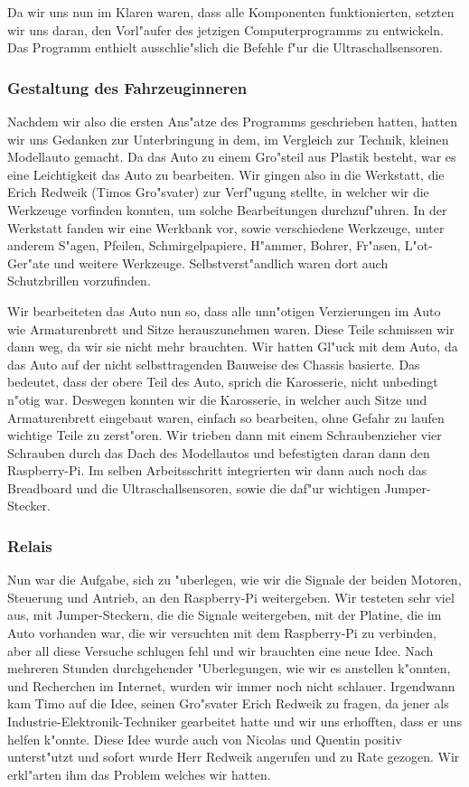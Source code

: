 \documentclass[a4paper,12pt]{article}
\begin{document}
Da wir uns nun im Klaren waren, dass alle Komponenten funktionierten, setzten wir uns daran, den Vorl"aufer des jetzigen Computerprogramms zu entwickeln.
Das Programm enthielt ausschlie"slich die Befehle f"ur die Ultraschallsensoren.

\subsubsection{Gestaltung des Fahrzeuginneren}\label{sec2.1.3}

Nachdem wir also die ersten Ans"atze des Programms geschrieben hatten, hatten wir uns Gedanken zur Unterbringung in dem, im Vergleich zur Technik, kleinen Modellauto gemacht.
Da das Auto zu einem Gro"steil aus Plastik besteht, war es eine Leichtigkeit das Auto zu bearbeiten.
Wir gingen also in die Werkstatt, die Erich Redweik (Timos Gro"svater) zur Verf"ugung stellte, in welcher wir die Werkzeuge vorfinden konnten, um solche Bearbeitungen durchzuf"uhren.
In der Werkstatt fanden wir eine Werkbank vor, sowie verschiedene Werkzeuge, unter anderem S"agen, Pfeilen, Schmirgelpapiere, H"ammer, Bohrer, Fr"asen, L"ot-Ger"ate und weitere Werkzeuge. Selbstverst"andlich waren dort auch Schutzbrillen vorzufinden.

Wir bearbeiteten das Auto nun so, dass alle unn"otigen Verzierungen im Auto wie Armaturenbrett und Sitze herauszunehmen waren.
Diese Teile schmissen wir dann weg, da wir sie nicht mehr brauchten.
Wir hatten Gl"uck mit dem Auto, da das Auto auf der nicht selbsttragenden Bauweise des Chassis basierte.
Das bedeutet, dass der obere Teil des Auto, sprich die Karosserie, nicht unbedingt n"otig war.
Deswegen konnten wir die Karosserie, in welcher auch Sitze und  Armaturenbrett eingebaut waren, einfach so bearbeiten, ohne Gefahr zu laufen wichtige Teile zu zerst"oren.
Wir trieben dann mit einem Schraubenzieher vier Schrauben durch das Dach des Modellautos und befestigten daran dann den Raspberry-Pi.
Im selben Arbeitsschritt integrierten wir dann auch noch das Breadboard und die Ultraschallsensoren, sowie die daf"ur wichtigen Jumper-Stecker.

\subsubsection{Relais}\label{sec2.1.4}

Nun war die Aufgabe, sich zu "uberlegen, wie wir die Signale der beiden Motoren, Steuerung und Antrieb, an den Raspberry-Pi weitergeben.
Wir testeten sehr viel aus, mit Jumper-Steckern, die die Signale weitergeben, mit der Platine, die im Auto vorhanden war, die wir versuchten mit dem Raspberry-Pi zu verbinden, aber all diese Versuche schlugen fehl und wir brauchten eine neue Idee.
Nach mehreren Stunden durchgehender "Uberlegungen, wie wir es anstellen k"onnten, und Recherchen im Internet, wurden wir immer noch nicht schlauer.
Irgendwann kam Timo auf die Idee, seinen Gro"svater Erich Redweik zu fragen, da jener als Industrie-Elektronik-Techniker gearbeitet hatte und wir uns erhofften, dass er uns helfen k"onnte.
Diese Idee wurde auch von Nicolas und Quentin positiv unterst"utzt und sofort wurde Herr Redweik angerufen und zu Rate gezogen.
Wir erkl"arten ihm das Problem welches wir hatten.
\end{document}
